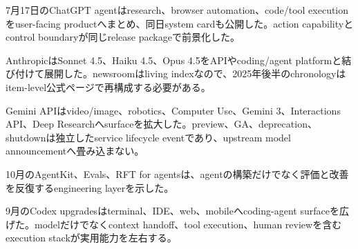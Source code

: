 
7月17日のChatGPT agentはresearch、browser automation、code/tool executionをuser-facing productへまとめ、同日system cardも公開した。action capabilityとcontrol boundaryが同じrelease packageで前景化した。\autocite{src-7a7213b68631,src-b074ccdb2d9e}


AnthropicはSonnet 4.5、Haiku 4.5、Opus 4.5をAPIやcoding/agent platformと結び付けて展開した。newsroomはliving indexなので、2025年後半のchronologyはitem-level公式ページで再構成する必要がある。\autocite{src-f6aa679babd7}


Gemini APIはvideo/image、robotics、Computer Use、Gemini 3、Interactions API、Deep Researchへsurfaceを拡大した。preview、GA、deprecation、shutdownは独立したservice lifecycle eventであり、upstream model announcementへ畳み込まない。\autocite{src-a24fd97eb3d0}


10月のAgentKit、Evals、RFT for agentsは、agentの構築だけでなく評価と改善を反復するengineering layerを示した。\autocite{src-0661418088b8}


9月のCodex upgradesはterminal、IDE、web、mobileへcoding-agent surfaceを広げた。modelだけでなくcontext handoff、tool execution、human reviewを含むexecution stackが実用能力を左右する。\autocite{src-6deeebce1719}
